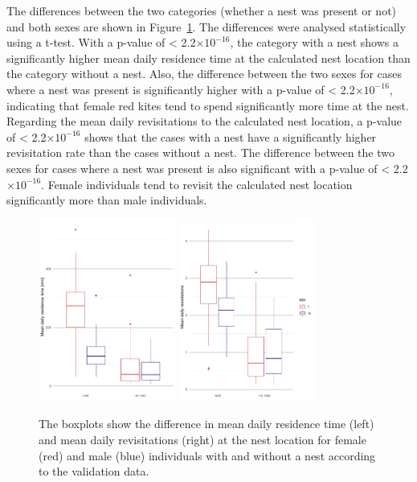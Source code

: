The differences between the two categories (whether a nest was present or not) and both sexes are shown in Figure~\ref{figure:res_time_revisits_sex_diff}. The differences were analysed statistically using a t-test. With a p-value of < 2.2$\times10^{-16}$, the category with a nest shows a significantly higher mean daily residence time at the calculated nest location than the category without a nest. Also, the difference between the two sexes for cases where a nest was present is significantly higher with a p-value of < 2.2$\times10^{-16}$, indicating that female red kites tend to spend significantly more time at the nest. Regarding the mean daily revisitations to the calculated nest location, a p-value of < 2.2$\times10^{-16}$ shows that the cases with a nest have a significantly higher revisitation rate than the cases without a nest. The difference between the two sexes for cases where a nest was present is also significant with a p-value of < 2.2$\times10^{-16}$. Female individuals tend to revisit the calculated nest location significantly more than male individuals.

\begin{figure}[H]
\centering
\includegraphics[width=0.4\textwidth]{figures/results/05_residence_time_sex_diff_no_legend.pdf}
\includegraphics[width=0.4\textwidth]{figures/results/07_revisits_sex_diff.pdf}
\caption[Boxplot of birds with and without nest]{The boxplots show the difference in mean daily residence time (left) and mean daily revisitations (right) at the nest location for female (red) and male (blue) individuals with and without a nest according to the validation data.}
\label{figure:res_time_revisits_sex_diff}
\end{figure}

